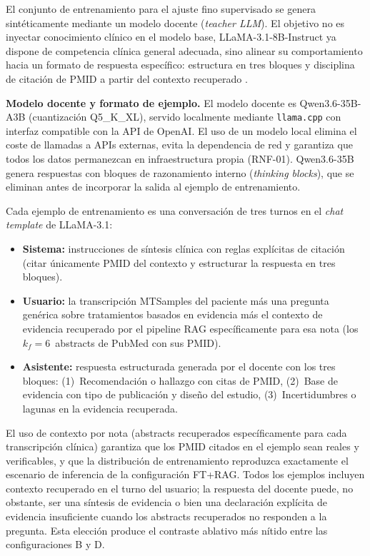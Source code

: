 \documentclass[11pt,a4paper,spanish]{book}
\numberwithin{equation}{chapter}
\numberwithin{figure}{chapter}
\begin{document}
El conjunto de entrenamiento para el ajuste fino supervisado se genera sintéticamente mediante un modelo docente (\textit{teacher LLM}). El objetivo no es inyectar conocimiento clínico en el modelo base, LLaMA-3.1-8B-Instruct ya dispone de competencia clínica general adecuada, sino alinear su comportamiento hacia un formato de respuesta específico: estructura en tres bloques y disciplina de citación de PMID a partir del contexto recuperado \cite{parthasarathy_ultimate_2024, ai6060109}.

\textbf{Modelo docente y formato de ejemplo.} El modelo docente es Qwen3.6-35B-A3B (cuantización Q5\_K\_XL), servido localmente mediante \texttt{llama.cpp} con interfaz compatible con la API de OpenAI. El uso de un modelo local elimina el coste de llamadas a APIs externas, evita la dependencia de red y garantiza que todos los datos permanezcan en infraestructura propia (RNF-01). Qwen3.6-35B genera respuestas con bloques de razonamiento interno (\textit{thinking blocks}), que se eliminan antes de incorporar la salida al ejemplo de entrenamiento.

Cada ejemplo de entrenamiento es una conversación de tres turnos en el \textit{chat template} de LLaMA-3.1:
\begin{itemize}
  \item \textbf{Sistema:} instrucciones de síntesis clínica con reglas explícitas de citación (citar únicamente PMID del contexto y estructurar la respuesta en tres bloques).
  \item \textbf{Usuario:} la transcripción MTSamples del paciente más una pregunta genérica sobre tratamientos basados en evidencia más el contexto de evidencia recuperado por el pipeline RAG específicamente para esa nota (los $k_f = 6$~abstracts de PubMed con sus PMID).
  \item \textbf{Asistente:} respuesta estructurada generada por el docente con los tres bloques: (1)~Recomendación o hallazgo con citas de PMID, (2)~Base de evidencia con tipo de publicación y diseño del estudio, (3)~Incertidumbres o lagunas en la evidencia recuperada.
\end{itemize}

El uso de contexto por nota (abstracts recuperados específicamente para cada transcripción clínica) garantiza que los PMID citados en el ejemplo sean reales y verificables, y que la distribución de entrenamiento reproduzca exactamente el escenario de inferencia de la configuración FT+RAG. Todos los ejemplos incluyen contexto recuperado en el turno del usuario; la respuesta del docente puede, no obstante, ser una síntesis de evidencia o bien una declaración explícita de evidencia insuficiente cuando los abstracts recuperados no responden a la pregunta. Esta elección produce el contraste ablativo más nítido entre las configuraciones B y D.
\end{document}
